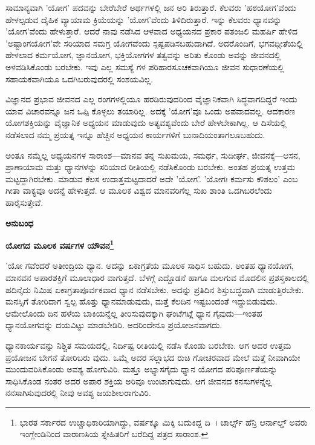 ಸಾಮಾನ್ಯವಾಗಿ 'ಯೋಗ' ಪದವನ್ನು ಬೇರೆಬೇರೆ ಅರ್ಥಗಳಲ್ಲಿ ಜನ ಅರಿ ತಿರುತ್ತಾರೆ. ಕೆಲವರು 'ಹಠಯೋಗ'ವೆಂದು ಹೇಳಲ್ಪಡುವ ದೈಹಿಕ ವ್ಯಾಯಾಮ ಕ್ರಿಯೆಯನ್ನು 'ಯೋಗ'ವೆಂದು ತಿಳಿದಿರುತ್ತಾರೆ. ಇನ್ನು ಕೆಲವರು ಧ್ಯಾನವನ್ನು 'ಯೋಗ'ವೆಂದು ಹೇಳುತ್ತಾರೆ. ಆದರೆ ನಾವು ನಡೆಸಿದ ಆಳವಾದ ಅಧ್ಯಯನದ ಪ್ರಕಾರ ಪತಂಜಲಿ ಮಹರ್ಷಿ ಹೇಳಿದ 'ಅಷ್ಟಾಂಗಯೋಗ'ವೇ ಸರಿಯಾದ ಸಮಗ್ರ ಯೋಗವೆಂದು ಸ್ಪಷ್ಟಪಡಿಸಬಹುದಾಗಿದೆ. ಅದರೊಂದಿಗೆ, ಭಗವದ್ಗೀತೆಯಲ್ಲಿ ಹೇಳಲಾದ ಕರ್ಮಯೋಗ, ಜ್ಞಾನಯೋಗ, ಭಕ್ತಿಯೋಗಗಳ ತತ್ವವನ್ನು ಅರಿತು ಕೊಂಡು ಅವನ್ನು ಜೀವನದಲ್ಲಿ ಅಳವಡಿಸಿಕೊಂಡು ಬರಬೇಕು. ಇವು ಎಲ್ಲ ಸಮಸ್ಯೆ ಗಳ ಪರಿಹಾರಸೂಚಕವಾಗಿಯೂ ಜೀವನ ಸುಧಾರಣೆಯಲ್ಲಿ ಸಹಾಯಕವಾಗಿಯೂ ಒದಗಿಬರುವುದರಲ್ಲಿ ಸಂಶಯವಿಲ್ಲ.

ವಿಜ್ಞಾನದ ಪ್ರಭಾವ ಜೀವನದ ಎಲ್ಲ ರಂಗಗಳಲ್ಲಿಯೂ ಹರಡಿರುವುದರಿಂದ ವೈಜ್ಞಾನಿಕವಾಗಿ ಸಿದ್ಧವಾಗದಿದ್ದರೆ ಇಂದು ಯಾವ ವಿಚಾರವನ್ನೂ ಜನ ಒಪ್ಪಿ ಕೊಳ್ಳಲು ತಯಾರಿಲ್ಲ. ಅದಕ್ಕೆ 'ಯೋಗ'ವೂ ಒಂದು ಅಪವಾದವಲ್ಲ. ಆದಕಾರಣ ಯೋಗಶಕ್ತಿಯನ್ನು ವೈಜ್ಞಾನಿಕ ಅಧ್ಯಯನ ಮಾಡುವುದು ಅತ್ಯವಶ್ಯವೆಂದು ಬೇರೆ ಹೇಳಬೇಕಾಗಿಲ್ಲ. ಆ ದಿಸೆಯಲ್ಲಿ ನಡೆಸಲಾದ ನಮ್ಮ ಪ್ರಯತ್ನ ಇನ್ನೂ ಹೆಚ್ಚಿನ ಅಧ್ಯಯನ ಕಾರ್ಯಗಳಿಗೆ ಬುನಾದಿಯಂತಾಗಲೂಬಹುದು.

ಅಂತೂ ನಮ್ಮೆಲ್ಲ ಅಧ್ಯಯನಗಳ ಸಾರಾಂಶ—ಮಾನವ ತನ್ನ ಸುಖಮಯ, ಸಮರ್ಥ, ಸುದೀರ್ಘ, ಜೀವನಕ್ಕೆ—ಆಸನ, ಪ್ರಾಣಾಯಾಮ ಮತ್ತು ಧ್ಯಾನಗಳನ್ನು ಸರಿಯಾದ ರೀತಿಯಲ್ಲಿ ನಡೆಸಿಕೊಂಡು ಬರಬೇಕು. ಅಂತಹ ಪ್ರಯತ್ನ ಉತ್ತಮ ಮಟ್ಟದ್ದಾಗಿರಬೇಕು. ಮಾಡುವ ಕೆಲಸ ಉದಾತ್ತಮಟ್ಟದಾದರೆ ಅದೇ 'ಯೋಗ'. 'ಯೋಗಃ ಕರ್ಮಸು ಕೌಶಲಂ' ಎಂಬ ಗೀತಾ ವಾಕ್ಯವೂ ಅದನ್ನೆ ಹೇಳುತ್ತದೆ. ಆ ಮೂಲಕ ವಿಶ್ವದ ಮಾನವರಿಗೆಲ್ಲ ಸುಖ ಶಾಂತಿ ಒದಗಿಬರಲೆಂದು ಹಾರೈಸುತ್ತೇವೆ.

\begin{center}
\textbf{ಅನುಬಂಧ}
\end{center}

\textbf{ಯೋಗದ ಮೂಲಕ  ವರ್ಷಗಳ ಯೌವನ\footnote{ಭಾರತ ಸರ್ಕಾರದ ಉಚ್ಚಾಧಿಕಾರಿಯಾಗಿದ್ದು,  ವರ್ಷಕ್ಕೂ ಮಿಕ್ಕಿ ಬದುಕಿದ್ದ ದಿ~। ಚಾರ್ಲ್ಸ್ ಹೆನ್ರಿ ಆರ್ನಾಲ್ಡ್ ಅವರು ಇಂಗ್ಲೇಂಡಿನಿಂದ ವಾರಾಣಸಿಯ ಸ್ನೇಹಿತರಿಗೆ ಬರೆದಿದ್ದ ಪತ್ರದ ಸಾರಾಂಶ.}}

'ಯೋ ಗವೆಂದರೆ ಅತೀಂದ್ರಿಯ ಧ್ಯಾನ. ಅದನ್ನು ಏಕಾಗ್ರತೆಯ ಮೂಲಕ ಸಾಧಿಸ ಬಹುದು. ಅಂತಹ ಧ್ಯಾನಯೋಗ, ಮಾನವನ ಅಪಾರಶಕ್ತಿಗೆ ಮೂಲಾಧಾರ ವಾಗುತ್ತದೆ. ಬೆಳಗ್ಗೆ ಎದ್ದೊಡನೆ ಹಾಗೂ ಮಲಗುವ ಮೊದಲಿನ ಪ್ರಶಸ್ತಕಾಲದಲ್ಲಿ ಹದಿನೈದು ನಿಮಿಷ ಏಕಾಗ್ರತಾಪೂರ್ವಕವಾದ ಧ್ಯಾನ ನಡೆಸಬೇಕು. ಅದನ್ನು ಪ್ರತಿದಿನ ಶಿಸ್ತುಬದ್ಧವಾಗಿ ಮಾಡುತ್ತಿರಬೇಕು. ಮನಸ್ಸಿಗೆ ತೋರಿದಾಗ ಸ್ವಲ್ಪ ಹೊತ್ತು ಧ್ಯಾನಮಾಡುವುದು, ಮತ್ತೆ ಕೆಲದಿನ ಇಷ್ಟಬಂದಂತೆ ಇದ್ದುಬಿಡುವುದು. ಆಮೇಲೊಂದು ದಿನ ಹಳೆಯ ಬಾಕಿಯನ್ನೆಲ್ಲ ತೀರಿಸುವುದಕ್ಕಾಗಿ ಘಂಟೆಗಟ್ಲೆ ಧ್ಯಾನ ಗೈವುದು—ಇಂತಹ ಧ್ಯಾನಯೋಗವನ್ನು ದಯವಿಟ್ಟು ಮಾಡಬೇಡಿರಿ. ಅದರಿಂದೇನೂ ಪ್ರಯೋಜನವಾಗದು.

ಧ್ಯಾನಕಾರ್ಯವನ್ನು ನಿಶ್ಚಿತ ಸಮಯದಲ್ಲಿ, ನಿರ್ದಿಷ್ಟ ರೀತಿಯಲ್ಲಿ ನಡೆಸಿ ಕೊಂಡು ಬರಬೇಕು. ಆಗ ಅದರ ಉತ್ತಮ ಪ್ರಯೋಜನ ಬೇಗನೆ ತೋರಿಬರು ವುದು. ಒಮ್ಮೆ ಅದರ ಸಲ್ಲಾಭದ ರುಚಿ ಗೋಚರವಾದ ಮೇಲೆ ಮತ್ತೆ ನೀವಾಗಿಯೇ ಮುಂದುವರಿಸಿಕೊಂಡು ಅವಶ್ಯ ಹೋಗುವಿರಿ. ಮತ್ತೂ ಅಭ್ಯಾಸಗೈದು ಧ್ಯಾನ ಯೋಗದ ಪರಿಪೂರ್ಣತೆಯನ್ನು ಸಾಧಿಸಿಕೊಂಡ ನಂತರ ಅದರ ಅಪಾರ ಶಕ್ತಿಯ ಅರಿವೂ ಉಂಟಾಗುವುದು. ಆಗ ಜೀವನದ ಕನಸುಗಳನ್ನೆಲ್ಲ ನನಸಾಗಿಸುವುದರಲ್ಲಿ ನೀವು ಅವಶ್ಯ ಜಯಶೀಲರಾಗುವಿರಿ.

